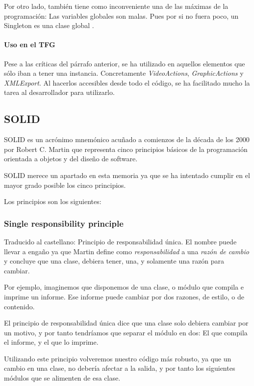 Por otro lado, tambi\'en tiene como inconveniente una de las m\'aximas de la programaci\'on: Las variables globales
son malas. Pues por si no fuera poco, un Singleton es una clase global \cite{Singleton:EVIL}.

\paragraph{Uso en el TFG}
Pese a las cr\'iticas del p\'arrafo anterior, se ha utilizado en aquellos elementos que s\'olo iban a tener
una instancia. Concretamente \emph{VideoActions}, \emph{GraphicActions} y \emph{XMLExport}. Al
hacerlos accesibles desde todo el c\'odigo, se ha facilitado mucho la tarea al desarrollador para utilizarlo.

\subsection{SOLID}
SOLID es un acr\'{o}nimo mnem\'{o}nico acu\~{n}ado a comienzos de la d\'{e}cada de los 2000 por 
Robert C. Martin \cite{SOLID:ADefinition}
que representa cinco principios b\'{a}sicos de la programaci\'{o}n orientada a objetos y del dise\~{n}o de software.

SOLID merece un apartado en esta memoria ya que se ha intentado cumplir en el mayor grado posible los cinco principios.

Los principios son los siguientes:
\subsubsection{Single responsibility principle}
Traducido al castellano: Principio de responsabilidad \'{u}nica. El nombre puede llevar a enga\~{n}o ya que Martin define como 
\emph{responsabilidad}
a una \emph{raz\'{o}n de cambio} \cite{SOLID:SRP} y concluye que una clase, debiera tener, una, y solamente una raz\'{o}n 
para cambiar.

Por ejemplo, imaginemos que disponemos de una clase, o m\'{o}dulo que compila e imprime un informe. 
Ese informe puede cambiar por dos razones, de estilo, o de contenido. 

El principio de responsabilidad \'{u}nica dice que una clase solo debiera cambiar por un motivo, y por 
tanto tendr\'{i}amos que separar el m\'{o}dulo en dos: El que compila el informe, y el que lo imprime.

Utilizando este principio volveremos nuestro c\'{o}digo m\'as robusto, ya que un cambio en una clase, no 
deber\'{i}a afectar a la salida, y por tanto los siguientes m\'{o}dulos que se alimenten de esa clase.

